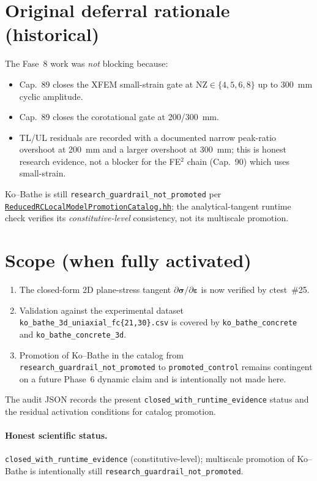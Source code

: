 \section{Original deferral rationale (historical)}

The Fase~8 work was \emph{not} blocking because:

\begin{itemize}
  \item Cap.~89 closes the XFEM small-strain gate at
        \(\mathrm{NZ}\in\{4,5,6,8\}\) up to 300~mm cyclic amplitude.
  \item Cap.~89 closes the corotational gate at 200/300~mm.
  \item TL/UL residuals are recorded with a documented narrow
        peak-ratio overshoot at 200~mm and a larger overshoot at
        300~mm; this is honest research evidence, not a blocker for
        the FE\(^2\) chain (Cap.~90) which uses small-strain.
\end{itemize}

Ko--Bathe is still \texttt{research\_guardrail\_not\_promoted} per
\href{run:src/validation/ReducedRCLocalModelPromotionCatalog.hh}{%
\texttt{ReducedRCLocalModelPromotionCatalog.hh}}; the
analytical-tangent runtime check verifies its
\emph{constitutive-level} consistency, not its multiscale
promotion.

\section{Scope (when fully activated)}

\begin{enumerate}
  \item The closed-form 2D plane-stress tangent
        \(\partial \boldsymbol{\sigma}/\partial \boldsymbol{\varepsilon}\)
        is now verified by ctest~\#25.
  \item Validation against the experimental dataset
        \texttt{ko\_bathe\_3d\_uniaxial\_fc\{21,30\}.csv} is
        covered by \texttt{ko\_bathe\_concrete} and
        \texttt{ko\_bathe\_concrete\_3d}.
  \item Promotion of Ko--Bathe in the catalog from
        \texttt{research\_guardrail\_not\_promoted} to
        \texttt{promoted\_control} remains contingent on a future
        Phase~6 dynamic claim and is intentionally not made here.
\end{enumerate}

The audit JSON
records the present
\texttt{closed\_with\_runtime\_evidence} status and the residual
activation conditions for catalog promotion.

\paragraph{Honest scientific status.}
\texttt{closed\_with\_runtime\_evidence} (constitutive-level);
multiscale promotion of Ko--Bathe is intentionally still
\texttt{research\_guardrail\_not\_promoted}.
